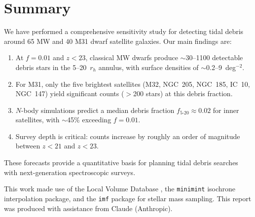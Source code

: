 \documentclass[twocolumn]{aastex63}
\begin{document}
\section{Summary} \label{sec:summary}

We have performed a comprehensive sensitivity study for detecting tidal debris around 65 MW and 40 M31 dwarf satellite galaxies. Our main findings are:

\begin{enumerate}
    \item At $f = 0.01$ and $z < 23$, classical MW dwarfs produce $\sim$30--1100 detectable debris stars in the 5--20~$r_h$ annulus, with surface densities of $\sim$0.2--9~deg$^{-2}$.
    \item For M31, only the five brightest satellites (M32, NGC~205, NGC~185, IC~10, NGC~147) yield significant counts ($>$200 stars) at this debris fraction.
    \item $N$-body simulations predict a median debris fraction $f_{5\text{-}20} \approx 0.02$ for inner satellites, with $\sim$45\% exceeding $f = 0.01$.
    \item Survey depth is critical: counts increase by roughly an order of magnitude between $z < 21$ and $z < 23$.
\end{enumerate}

These forecasts provide a quantitative basis for planning tidal debris searches with next-generation spectroscopic surveys.

\begin{acknowledgments}
This work made use of the Local Volume Database \citep{Pace2024}, the \texttt{minimint} isochrone interpolation package, and the \texttt{imf} package for stellar mass sampling. This report was produced with assistance from Claude (Anthropic).
\end{acknowledgments}



\end{document}
